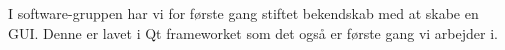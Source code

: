 
I software-gruppen har vi for første gang stiftet bekendskab med at skabe en GUI. Denne er lavet i Qt frameworket som det også er første gang vi arbejder i.